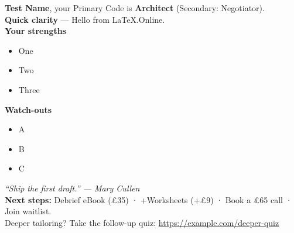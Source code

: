 \textbf{Test Name}, your Primary Code is \textbf{Architect} (Secondary: Negotiator).\\[3mm]
\textbf{Quick clarity} — Hello from LaTeX.Online.\\[2mm]
\textbf{Your strengths}\begin{itemize}\item One \item Two \item Three\end{itemize}
\textbf{Watch-outs}\begin{itemize}\item A \item B \item C\end{itemize}
\emph{“Ship the first draft.” — Mary Cullen}\\[2mm]
\textbf{Next steps:} Debrief eBook (£35) · +Worksheets (+£9) · Book a £65 call · Join waitlist.\\
Deeper tailoring? Take the follow-up quiz: \url{https://example.com/deeper-quiz}
